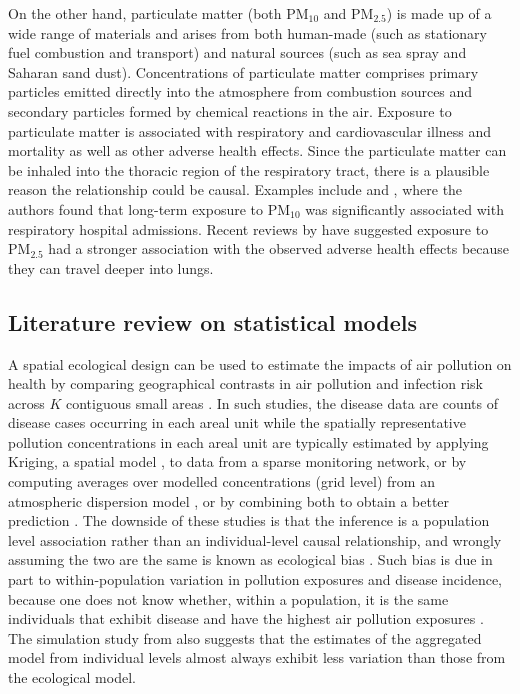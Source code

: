 \documentclass[12,]{article}
\begin{document}
On the other hand, particulate matter (both PM\(_{10}\) and
PM\(_{2.5}\)) is made up of a wide range of materials and arises from
both human-made (such as stationary fuel combustion and transport) and
natural sources (such as sea spray and Saharan sand dust).
Concentrations of particulate matter comprises primary particles emitted
directly into the atmosphere from combustion sources and secondary
particles formed by chemical reactions in the air. Exposure to
particulate matter is associated with respiratory and cardiovascular
illness and mortality as well as other adverse health effects. Since the
particulate matter can be inhaled into the thoracic region of the
respiratory tract, there is a plausible reason the relationship could be
causal. Examples include \textcite{Lee2009} and \textcite{Lee2012b},
where the authors found that long-term exposure to PM\(_{10}\) was
significantly associated with respiratory hospital admissions. Recent
reviews by \textcite{COMEAP2010} have suggested exposure to PM\(_{2.5}\)
had a stronger association with the observed adverse health effects
because they can travel deeper into lungs.

\hypertarget{literature-review-on-statistical-models}{%
\subsection{Literature review on statistical
models}\label{literature-review-on-statistical-models}}

A spatial ecological design can be used to estimate the impacts of air
pollution on health by comparing geographical contrasts in air pollution
and infection risk across \(K\) contiguous small areas
\autocites{Huang2018}{Napier2018}{Rushworth2014}. In such studies, the
disease data are counts of disease cases occurring in each areal unit
while the spatially representative pollution concentrations in each
areal unit are typically estimated by applying Kriging, a spatial model
\autocite{Diggle2007}, to data from a sparse monitoring network, or by
computing averages over modelled concentrations (grid level) from an
atmospheric dispersion model
\autocites{Wu2020}{Maheswaran2006}{Lee2009}{Warren2012a}, or by
combining both to obtain a better prediction
\autocites{Huang2018}{VinikoorImler2014}{Sacks2014}. The downside of
these studies is that the inference is a population level association
rather than an individual-level causal relationship, and wrongly
assuming the two are the same is known as ecological bias
\autocites{Arbia1988}{Wakefield2001}. Such bias is due in part to
within-population variation in pollution exposures and disease
incidence, because one does not know whether, within a population, it is
the same individuals that exhibit disease and have the highest air
pollution exposures \autocite{Lee2020}. The simulation study from
\textcite{Lee2020} also suggests that the estimates of the aggregated
model from individual levels almost always exhibit less variation than
those from the ecological model.
\end{document}
